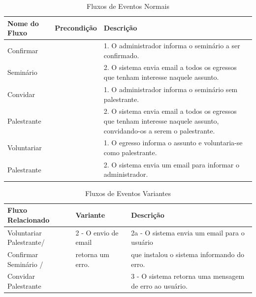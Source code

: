 \begin{table}[h]
	\centering    \vspace{0.5cm}     \footnotesize
	\caption{Fluxos de Eventos Normais}
	\begin{tabular}{|p{2.3cm}|p{1.8cm}|p{10.7cm}|} \hline  \rowcolor[rgb]{0.8,0.8,0.8}
 					
 		Nome do Fluxo & Precondição & Descrição  \\ \hline		
		
		Confirmar & {} & 1. O administrador informa o seminário a ser confirmado.  \\
		Seminário & {} & 2. O sistema envia email a todos os egressos que tenham interesse naquele assunto.\\ \hline 
			
		Convidar & {} & 1. O administrador informa o seminário sem palestrante.  \\
		Palestrante & {} & 2. O sistema envia email a todos os egressos que tenham interesse naquele assunto, convidando-os a serem o palestrante.\\ \hline 
		
		
		Voluntariar & {} & 1. O egresso informa o assunto e voluntaria-se como palestrante.  \\
		Palestrante & {} & 2. O sistema envia um email para informar o administrador.\\ \hline 
		
	\end{tabular}	
\end{table}

	\begin{table}[h]
		\centering 	\vspace{0.5cm}    \footnotesize
		\caption{Fluxos de Eventos Variantes}
		\begin{tabular}{|p{4.3cm}|p{3.5cm}|p{7.0cm}|}    \hline  \rowcolor[rgb]{0.8,0.8,0.8}
 		
 			Fluxo Relacionado &  Variante  &  Descrição    \\	\hline		
		
			Voluntariar Palestrante/  & 2 - O envio de email      & 2a - O sistema envia um email para o usuário   \\ 
			Confirmar Seminário / 	  & retorna um erro.			&  que instalou o sistema informando do erro. \\
			Convidar Palestrante     &{}              & 3 - O sistema retorna uma mensagem de erro ao usuário. \\\hline
		
		\end{tabular}
	\end{table}	
	
